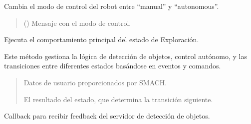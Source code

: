 \documentclass[a4paper,10pt,spanish]{sphinxmanual}
\begin{document}
\begin{fulllineitems}
\begin{fulllineitems}
\sphinxAtStartPar
Cambia el modo de control del robot entre “manual” y “autonomous”.
\begin{quote}\begin{description}
\sphinxAtStartPar
{} () \textendash{} Mensaje con el modo de control.

\end{description}\end{quote}

\end{fulllineitems}


\begin{fulllineitems}
\label{\detokenize{squad_state_manager:squad_state_manager.EstadoExploracion.execute}}
\pysigstartsignatures
{}
\pysigstopsignatures
\sphinxAtStartPar
Ejecuta el comportamiento principal del estado de Exploración.

\sphinxAtStartPar
Este método gestiona la lógica de detección de objetos, control autónomo,
y las transiciones entre diferentes estados basándose en eventos y comandos.
\begin{quote}\begin{description}
\sphinxAtStartPar
{} \textendash{} Datos de usuario proporcionados por SMACH.

\sphinxAtStartPar
El resultado del estado, que determina la transición siguiente.

\sphinxAtStartPar
{}

\end{description}\end{quote}

\end{fulllineitems}


\begin{fulllineitems}
\label{\detokenize{squad_state_manager:squad_state_manager.EstadoExploracion.feedback_cb}}
\pysigstartsignatures
{}
\pysigstopsignatures
\sphinxAtStartPar
Callback para recibir feedback del servidor de detección de objetos.


\end{fulllineitems}
\end{fulllineitems}
\end{document}
